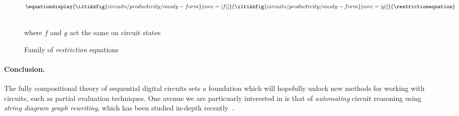 \documentclass[10pt]{article}
\begin{document}
\begin{figure}
    \centering
    \(\equationdisplay{
        \iltikzfig{circuits/productivity/mealy-form}[core=|f|]
    }{
        \iltikzfig{circuits/productivity/mealy-form}[core=|g|]
    }{\restrictionequation}\)
    \,\,
    \begin{minipage}{0.25\textwidth}
        \centering
        where \(f\) and \(g\) act the same on circuit states
    \end{minipage}
    \caption{Family of \emph{restriction} equations}
    \label{fig:restriction-equations}
\end{figure}

\paragraph*{Conclusion.}

The fully compositional theory of sequential digital circuits sets a foundation
which will hopefully unlock new methods for working with circuits, such as
partial evaluation techniques.
One avenue we are particuarly interested in is that of \emph{automating}
circuit reasoning using \emph{string diagram graph rewriting}, which has been
studied in-depth recently~\cite{bonchi2022string,ghica2023rewriting}.

\printbibliography[heading=bibintoc,title={References}]
\end{document}
